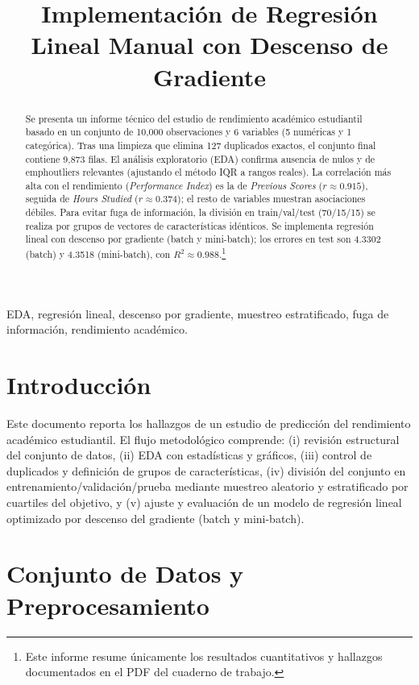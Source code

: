 \documentclass[conference]{IEEEtran}
\title{Implementación de Regresión Lineal
Manual con Descenso de Gradiente\vspace{-0.35em}}
\author{\IEEEauthorblockN{Priscilla Jim\'enez Salgado\IEEEauthorrefmark{1}, Fabi\'an Araya Ortega\IEEEauthorrefmark{1}, David Acu\~na L\'opez\IEEEauthorrefmark{1}}
\IEEEauthorblockA{\IEEEauthorrefmark{1}Curso de Inteligencia Artificial, Escuela de Ingenier\'ia en Computaci\'on, Tecnol\'ogico de Costa Rica (TEC)\\}}
\begin{document}
\maketitle

\begin{abstract}
Se presenta un informe t\'ecnico del estudio de rendimiento acad\'emico estudiantil basado en un conjunto de 10{,}000 observaciones y 6 variables (5 num\'ericas y 1 categ\'orica). Tras una limpieza que elimina 127 duplicados exactos, el conjunto final contiene 9{,}873 filas. El an\'alisis exploratorio (EDA) confirma ausencia de nulos y de \\emph{outliers} relevantes (ajustando el m\'etodo IQR a rangos reales). La correlaci\'on m\'as alta con el rendimiento (\emph{Performance Index}) es la de \emph{Previous Scores} ($r\approx0{.}915$), seguida de \emph{Hours Studied} ($r\approx0{.}374$); el resto de variables muestran asociaciones d\'ebiles. Para evitar fuga de informaci\'on, la divisi\'on en train/val/test (70/15/15) se realiza por grupos de vectores de caracter\'isticas id\'enticos. Se implementa regresi\'on lineal con descenso por gradiente (batch y mini-batch); los errores en test son \SI{4.3302}{} (batch) y \SI{4.3518}{} (mini-batch), con $R^2\approx0{.}988$.\footnote{Este informe resume \'unicamente los resultados cuantitativos y hallazgos documentados en el PDF del cuaderno de trabajo.}
\end{abstract}

\begin{IEEEkeywords}
EDA, regresi\'on lineal, descenso por gradiente, muestreo estratificado, fuga de informaci\'on, rendimiento acad\'emico.
\end{IEEEkeywords}

\section{Introducci\'on}
Este documento reporta los hallazgos de un estudio de predicci\'on del rendimiento acad\'emico estudiantil. El flujo metodol\'ogico comprende: (i) revisi\'on estructural del conjunto de datos, (ii) EDA con estad\'isticas y gr\'aficos, (iii) control de duplicados y definici\'on de grupos de caracter\'isticas, (iv) divisi\'on del conjunto en entrenamiento/validaci\'on/prueba mediante muestreo aleatorio y estratificado por cuartiles del objetivo, y (v) ajuste y evaluaci\'on de un modelo de regresi\'on lineal optimizado por descenso del gradiente (batch y mini-batch).

\section{Conjunto de Datos y Preprocesamiento}
\end{document}
